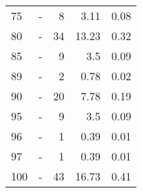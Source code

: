 \begin{longtable}{lXrrr}
        75 & \multicolumn{1}{X}{-} & %
          \num{8} &
          \num[round-mode=places,round-precision=2]{3.11} &
          \num[round-mode=places,round-precision=2]{0.08} \\

        80 & \multicolumn{1}{X}{-} & %
          \num{34} &
          \num[round-mode=places,round-precision=2]{13.23} &
          \num[round-mode=places,round-precision=2]{0.32} \\

        85 & \multicolumn{1}{X}{-} & %
          \num{9} &
          \num[round-mode=places,round-precision=2]{3.5} &
          \num[round-mode=places,round-precision=2]{0.09} \\

        89 & \multicolumn{1}{X}{-} & %
          \num{2} &
          \num[round-mode=places,round-precision=2]{0.78} &
          \num[round-mode=places,round-precision=2]{0.02} \\

        90 & \multicolumn{1}{X}{-} & %
          \num{20} &
          \num[round-mode=places,round-precision=2]{7.78} &
          \num[round-mode=places,round-precision=2]{0.19} \\

        95 & \multicolumn{1}{X}{-} & %
          \num{9} &
          \num[round-mode=places,round-precision=2]{3.5} &
          \num[round-mode=places,round-precision=2]{0.09} \\

        96 & \multicolumn{1}{X}{-} & %
          \num{1} &
          \num[round-mode=places,round-precision=2]{0.39} &
          \num[round-mode=places,round-precision=2]{0.01} \\

        97 & \multicolumn{1}{X}{-} & %
          \num{1} &
          \num[round-mode=places,round-precision=2]{0.39} &
          \num[round-mode=places,round-precision=2]{0.01} \\

        100 & \multicolumn{1}{X}{-} & %
          \num{43} &
          \num[round-mode=places,round-precision=2]{16.73} &
          \num[round-mode=places,round-precision=2]{0.41} \\


\end{longtable}
